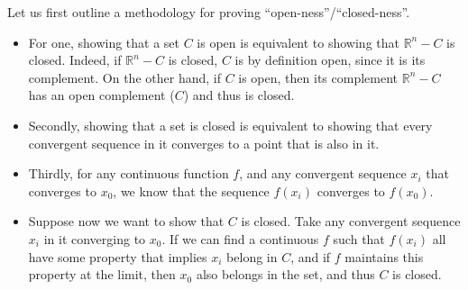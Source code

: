 \begin{solution}

    Let us first outline a methodology for proving ``open-ness''/``closed-ness''. 
    \begin{itemize}
        \item For one, showing that a set $C$ is open is equivalent to showing that $\mathbb{R}^n - C$ is closed. Indeed, if $\mathbb{R}^n - C$ is closed, $C$ is by definition open, since it is its complement. On the other hand, if $C$ is open, then its complement $\mathbb{R}^n - C$ has an open complement ($C$) and thus is closed.
        \item Secondly, showing that a set is closed is equivalent to showing that every convergent sequence in it converges to a point that is also in it.
        \item Thirdly, for any continuous function $f$, and any convergent sequence $x_i$ that converges to $x_0$, we know that the sequence $f(x_i)$ converges to $f(x_0)$. 
        \item Suppose now we want to show that $C$ is closed. Take any convergent sequence $x_i$ in it converging to $x_0$. If we can find a continuous $f$ such that $f(x_i)$ all have some property that implies $x_i$ belong in $C$, and if $f$ maintains this property at the limit, then $x_0$ also belongs in the set, and thus $C$ is closed.
    \end{itemize}


\end{solution}
